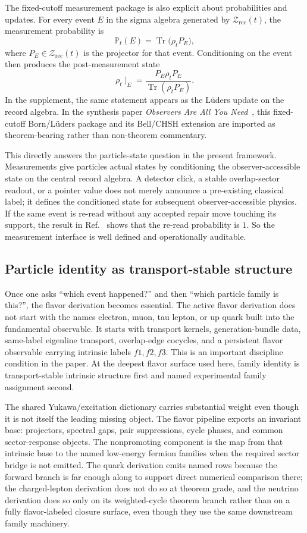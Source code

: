 \documentclass[11pt]{article}
\begin{document}
The fixed-cutoff measurement package is also explicit about probabilities and updates. For every
event \(E\) in the sigma algebra generated by \(\mathcal Z_{\mathrm{rec}}(t)\), the measurement
probability is
\[
\mathbb P_t(E)=\operatorname{Tr}\!\bigl(\rho_t P_E\bigr),
\]
where \(P_E\in\mathcal Z_{\mathrm{rec}}(t)\) is the projector for that event. Conditioning on the
event then produces the post-measurement state
\[
\rho_t\!\mid_E
=
\frac{P_E\rho_t P_E}{\operatorname{Tr}(\rho_t P_E)}.
\]
In the supplement, the same statement appears as the L\"uders update on the record algebra. In
the synthesis paper \emph{Observers Are All You Need}~\cite{ophsynthesis}, this fixed-cutoff
Born/L\"uders package and its Bell/CHSH extension are imported as theorem-bearing rather than
non-theorem commentary.

This directly answers the particle-state question in the present framework. Measurements give particles
actual states by conditioning the observer-accessible state on the central record algebra. A
detector click, a stable overlap-sector readout, or a pointer value does not merely announce a
pre-existing classical label; it defines the conditioned state for subsequent observer-accessible
physics. If the same event is re-read without any accepted repair move touching its support, the
result in Ref.~\cite{ophmicrophysics} shows that the re-read probability is \(1\). So the measurement interface is
well defined and operationally auditable.

\subsection{Particle identity as transport-stable structure}

Once one asks ``which event happened?'' and then ``which particle family is this?'', the
flavor derivation becomes essential. The active flavor derivation does not start with the
names electron, muon, tau lepton, or up quark built into the fundamental observable. It starts
with transport kernels, generation-bundle data, same-label eigenline transport, overlap-edge
cocycles, and a persistent flavor observable carrying intrinsic labels \(f1,f2,f3\). This is an
important discipline condition in the paper. At the deepest flavor surface used here, family
identity is transport-stable intrinsic structure first and named experimental family assignment
second.

The shared Yukawa/excitation dictionary carries substantial weight even though it is not
itself the leading missing object. The flavor pipeline exports an invariant base:
projectors, spectral gaps, pair suppressions, cycle phases, and common sector-response objects.
The nonpromoting component is the map from that intrinsic base to the named low-energy fermion
families when the required sector bridge is not emitted. The quark derivation emits named rows because the forward branch is far enough along to
support direct numerical comparison there; the charged-lepton derivation does not do so at theorem
grade, and the neutrino derivation does so only on its weighted-cycle theorem branch rather than
on a fully flavor-labeled closure surface, even though they use the same downstream family machinery.
\end{document}
